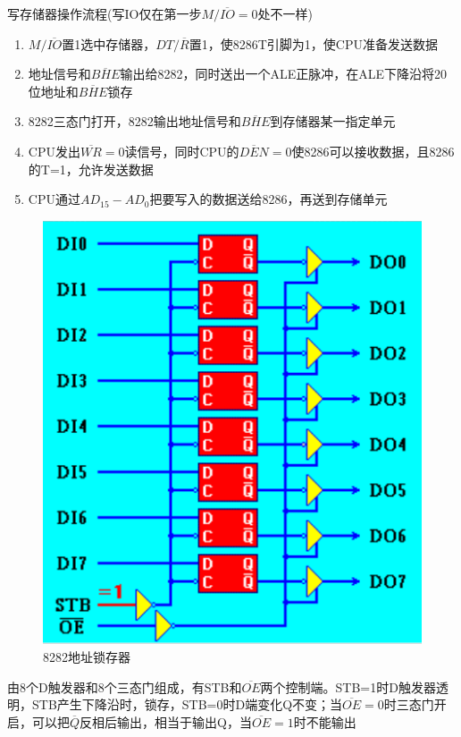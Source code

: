 写存储器操作流程(写IO仅在第一步$M/\overline{IO}=0$处不一样)
\begin{enumerate}
    \item $M/\overline{IO}$置1选中存储器，$DT/\overline{R}$置1，使8286T引脚为1，使CPU准备发送数据
    \item 地址信号和$\overline{BHE}$输出给8282，同时送出一个ALE正脉冲，在ALE下降沿将20位地址和$\overline{BHE}$锁存
    \item 8282三态门打开，8282输出地址信号和$\overline{BHE}$到存储器某一指定单元
    \item CPU发出$\overline{WR}=0$读信号，同时CPU的$\overline{DEN}=0$使8286可以接收数据，且8286的T=1，允许发送数据
    \item CPU通过$AD_{15}-AD_{0}$把要写入的数据送给8286，再送到存储单元
\end{enumerate}
\begin{figure}[H]
    \centering
    \includegraphics[scale=1]{part_8086CPU/part_8086CPU_pic/8282地址锁存器.png}
    \caption{8282地址锁存器}
\end{figure}
由8个D触发器和8个三态门组成，有STB和$\overline{OE}$两个控制端。STB=1时D触发器透明，STB产生下降沿时，锁存，STB=0时D端变化Q不变；当$\overline{OE}=0$时三态门开启，可以把$\overline{Q}$反相后输出，相当于输出Q，当$\overline{OE}=1$时不能输出

